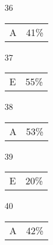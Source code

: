 \documentclass[12pt]{article}
\begin{document}
\begin{multicols}{5}
\begin{enumerate}
\item[]
\item[36] \begin{tabular}{cc} A & 41\%\end{tabular}
\item[37] \begin{tabular}{cc} E & 55\%\end{tabular}
\item[38] \begin{tabular}{cc} A & 53\%\end{tabular}
\item[39] \begin{tabular}{cc} E & 20\%\end{tabular}
\item[40] \begin{tabular}{cc} A & 42\%\end{tabular}

\item[]


\end{enumerate}
\end{multicols}
\end{document}
